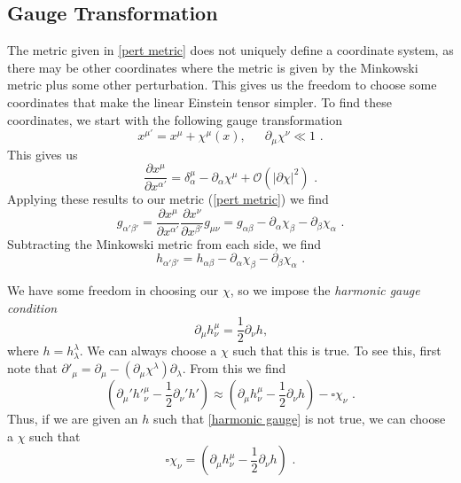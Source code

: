 \documentclass[11pt]{cuthesis}
\newcommand{\mn}{_{\mu\nu}}
\newcommand{\fs}{\text{ .}}
\newcommand{\pd}{\partial}
\begin{document}
\subsection{Gauge Transformation}
The metric given in \ref{pert metric} does not uniquely define a coordinate system, as there may be other coordinates where the metric is given by the Minkowski metric plus some other perturbation. This gives us the freedom to choose some coordinates that make the linear Einstein tensor simpler. To find these coordinates, we start with the following gauge transformation
\begin{equation}
x^{\mu'}=x^\mu +\chi ^\mu (x)\text{,} \hspace{20pt}\partial_\mu \chi^\nu \ll 1\fs
\end{equation} 
This gives us
\begin{equation}
\frac{\pd x^\mu}{\pd x^{\alpha'}}=\delta^\mu_\alpha-\pd_\alpha\chi^\mu +\mathcal{O}(|\pd \chi|^2) \fs
\end{equation}  
Applying these results to our metric (\ref{pert metric}) we find
\begin{equation} 
g_{\alpha' \beta'}=\frac{\pd x^\mu}{\pd x^{\alpha'}}\frac{\pd x^\nu}{\pd x^{\beta'}}g\mn=g_{\alpha \beta}-\pd_\alpha \chi_\beta -\pd_\beta \chi_\alpha \fs
\end{equation}
Subtracting the Minkowski metric from each side, we find 
\begin{equation} \label{pert transf}
h_{\alpha' \beta'}=h_{\alpha \beta}-\pd_\alpha\chi_\beta-\pd_\beta\chi_\alpha \fs
\end{equation}

We have some freedom in choosing our $\chi$, so we impose the \textit{harmonic gauge condition}
\begin{equation} \label{harmonic gauge}
\partial_\mu h^\mu_\nu = \frac{1}{2} \partial_\nu h \text{,}
\end{equation}
where $h=h^\lambda_\lambda$. We can always choose a $\chi$ such that this is true. To see this, first note that $\partial'_\mu = \partial_\mu - (\partial_\mu \chi^\lambda) \partial_\lambda$. From this we find
\begin{equation}
(\partial_\mu' {h'}_\nu^\mu - \frac{1}{2}\partial_\nu' h') \approx (\partial_\mu h^\mu_\nu - \frac{1}{2} \partial_\nu h ) -\square \chi_\nu \fs
\end{equation}
Thus, if we are given an $h$ such that \ref{harmonic gauge} is not true, we can choose a $\chi$ such that 
\begin{equation} \label{harmonic chi}
\square \chi_\nu = (\partial_\mu h^\mu_\nu - \frac{1}{2}\partial_\nu h) \fs
\end{equation}
\end{document}
